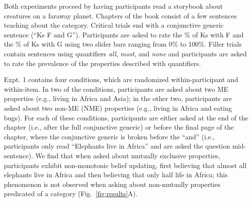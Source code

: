 \documentclass[letterpaper, 12pt]{article}
\begin{document}

Both experiments proceed by having participants read a storybook about creatures on a faraway planet. Chapters of the book consist of a few sentences teaching about the category. Critical trials end with a conjunctive generic sentence (``Ks F and G''). Participants are asked to rate the \% of Ks with F and the \% of Ks with G using two slider bars ranging from 0\% to 100\%. Filler trials contain sentences using quantifiers \emph{all}, \emph{most}, and \emph{none} and participants are asked to rate the prevalence of the properties described with quantifiers. 

Expt. 1 contains four conditions, which are randomized within-participant and within-item. In two of the conditions, participants are asked about two ME properties (e.g., living in Africa and Asia); in the other two, participants are asked about two non-ME (NME) properties (e.g., living in Africa and eating bugs). For each of these conditions, participants are either asked at the end of the chapter (i.e., after the full conjunctive generic) or before the final page of the chapter, where the conjunctive generic is broken before the ``and'' (i.e., participants only read ``Elephants live in Africa'' and are asked the question mid-sentence). We find that when asked about mutually exclusive properties, participants exhibit non-monotonic belief updating, first believing that almost all elephants live in Africa and then believing that only half life in Africa; this phenomenon is not observed when asking about non-mutually properties predicated of a category (Fig.~\ref{fig:results}A).
\end{document}
